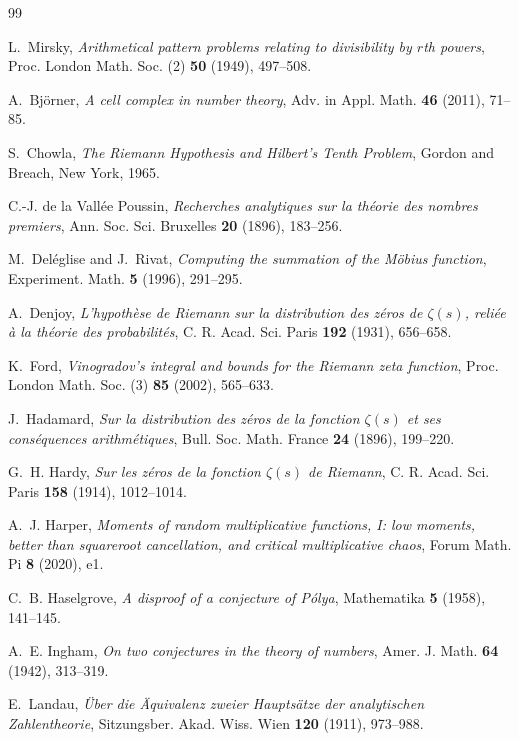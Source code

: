 \documentclass[11pt,reqno]{amsart}
\numberwithin{equation}{section}
\theoremstyle{plain}
\theoremstyle{definition}
\theoremstyle{remark}
\begin{document}
\begin{thebibliography}{99}

L.~Mirsky, \emph{Arithmetical pattern problems relating to divisibility by $r$th powers}, Proc. London Math. Soc. (2) \textbf{50} (1949), 497--508.

A.~Bj\"orner, \emph{A cell complex in number theory}, Adv. in Appl. Math.
\textbf{46} (2011), 71--85.

S.~Chowla, \emph{The Riemann Hypothesis and Hilbert's Tenth Problem}, Gordon
and Breach, New York, 1965.

C.-J. de la Vall\'ee Poussin, \emph{Recherches analytiques sur la th\'eorie
des nombres premiers}, Ann. Soc. Sci. Bruxelles \textbf{20} (1896), 183--256.

M.~Del\'eglise and J.~Rivat, \emph{Computing the summation of the M\"obius
function}, Experiment. Math. \textbf{5} (1996), 291--295.

A.~Denjoy, \emph{L'hypoth\`ese de Riemann sur la distribution des z\'eros de
$\zeta(s)$, reli\'ee \`a la th\'eorie des probabilit\'es}, C. R. Acad. Sci.
Paris \textbf{192} (1931), 656--658.

K.~Ford, \emph{Vinogradov's integral and bounds for the Riemann zeta
function}, Proc. London Math. Soc. (3) \textbf{85} (2002), 565--633.

J.~Hadamard, \emph{Sur la distribution des z\'eros de la fonction $\zeta(s)$
et ses cons\'equences arithm\'etiques}, Bull. Soc. Math. France \textbf{24}
(1896), 199--220.

G.~H. Hardy, \emph{Sur les z\'eros de la fonction $\zeta(s)$ de Riemann},
C. R. Acad. Sci. Paris \textbf{158} (1914), 1012--1014.

A.~J. Harper, \emph{Moments of random multiplicative functions, I: low
moments, better than squareroot cancellation, and critical multiplicative
chaos}, Forum Math. Pi \textbf{8} (2020), e1.

C.~B. Haselgrove, \emph{A disproof of a conjecture of P\'olya}, Mathematika
\textbf{5} (1958), 141--145.

A.~E. Ingham, \emph{On two conjectures in the theory of numbers}, Amer. J.
Math. \textbf{64} (1942), 313--319.

E.~Landau, \emph{\"Uber die \"Aquivalenz zweier Haupts\"atze der analytischen
Zahlentheorie}, Sitzungsber. Akad. Wiss. Wien \textbf{120} (1911), 973--988.


\end{thebibliography}
\end{document}
